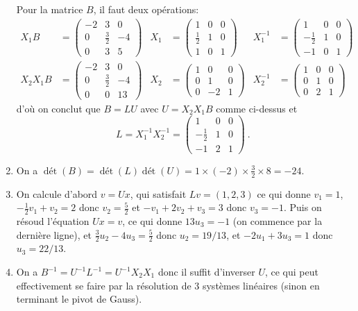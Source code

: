 \documentclass[10pt,a4paper]{article}
\renewcommand\det{\mathop{\textrm{d\'et}}}
\begin{document}
\begin{enumerate}
Pour la matrice $B$, il faut deux opérations:
\begin{align*}
X_1 B &= \begin{pmatrix} -2&3&0 \\0 & \frac{3}{2} & -4 \\ 0 & 3 & 5 \end{pmatrix} & X_1&=\begin{pmatrix} 1&0&0 \\ \frac{1}{2} & 1 & 0 \\ 1&0&1 \end{pmatrix} & X_1^{-1}&=\begin{pmatrix} 1&0&0\\-\frac{1}{2}&1&0\\-1&0&1\end{pmatrix} \\
X_2X_1B&=\begin{pmatrix}-2&3&0\\0&\frac{3}{2}&-4\\0&0&13\end{pmatrix} & X_2&=\begin{pmatrix}1&0&0\\0&1&0\\0&-2&1\end{pmatrix} & X_2^{-1}&=\begin{pmatrix} 1&0&0\\0&1&0\\ 0&2&1\end{pmatrix}
\end{align*}
d'où on conclut que $B=LU$ avec $U=X_2X_1 B$ comme ci-dessus et 
\[
L=X_1^{-1}X_2^{-1} =\begin{pmatrix} 1 & 0 & 0\\ -\frac{1}{2} & 1 &0 \\ -1&2&1 \end{pmatrix}~.
\]
\item On a $\det(B)=\det(L)\det(U)=1\times(-2)\times \frac{3}{2}\times 8=-24$.
\item On calcule d'abord $v=Ux$, qui satisfait $Lv=(1,2,3)$ ce qui donne $v_1=1$, $-\frac{1}{2}v_1+v_2=2$ donc $v_2=\frac{5}{2}$ et $-v_1+2v_2+v_3=3$ donc $v_3=-1$. Puis on résoud l'équation $Ux=v$, ce qui donne $13u_3=-1$ (on commence par la dernière ligne), et $\frac{3}{2} u_2-4u_3=\frac{5}{2}$ donc $u_2=19/13$, et $-2u_1+3 u_3=1$ donc $u_3=22/13$.
\item On a $B^{-1}=U^{-1} L^{-1}=U^{-1}X_2X_1$ donc il suffit d'inverser $U$, ce qui peut effectivement se faire par la résolution de 3 systèmes linéaires (sinon en terminant le pivot de Gauss). 
\end{enumerate}
\eexer
\end{document}
